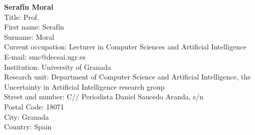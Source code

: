 \documentclass[11pt,dvipsnames,usenames,a4paper]{article}
\begin{document}
{\bf Seraf\'in Moral}\\
Title: Prof.\\
First name: Seraf\'in\\
Surname:  Moral \\
Current occupation: Lecturer in Computer Sciences and Artificial Intelligence\\
E-mail: smc@decsai.ugr.es\\
Institution: University of Granada\\
Research unit: Department of Computer Science and Artificial Intelligence, the Uncertainty in Artificial Intelligence research group\\
Street and number: C// Periodista Daniel Saucedo Aranda, s/n\\
Postal Code: 18071\\
City: Granada\\
Country: Spain\\[-7pt]







\end{document}
